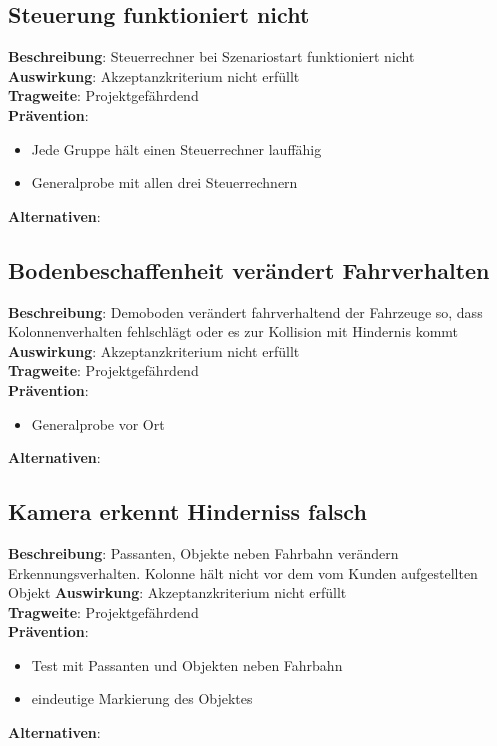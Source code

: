 \documentclass[a4paper, 12pt, titlepage]{scrartcl}
\begin{document}
	\subsection{Steuerung funktioniert nicht}
		\textbf{Beschreibung}: Steuerrechner bei Szenariostart funktioniert nicht\\
		\textbf{Auswirkung}: Akzeptanzkriterium nicht erfüllt\\
		\textbf{Tragweite}: Projektgefährdend\\
		\textbf{Prävention}:		
		\begin{itemize}
			\item Jede Gruppe hält einen Steuerrechner lauffähig
			\item Generalprobe mit allen drei Steuerrechnern
		\end{itemize}
		\textbf{Alternativen}: 

	\subsection{Bodenbeschaffenheit verändert Fahrverhalten}
		\textbf{Beschreibung}: Demoboden verändert fahrverhaltend der Fahrzeuge so, dass Kolonnenverhalten fehlschlägt oder es zur Kollision mit Hindernis kommt\\
		\textbf{Auswirkung}: Akzeptanzkriterium nicht erfüllt\\
		\textbf{Tragweite}: Projektgefährdend\\
		\textbf{Prävention}:
		\begin{itemize}
			\item Generalprobe vor Ort
		\end{itemize}
		\textbf{Alternativen}: 

	\subsection{Kamera erkennt Hinderniss falsch}
		\textbf{Beschreibung}: Passanten, Objekte neben Fahrbahn verändern Erkennungsverhalten. Kolonne hält nicht vor dem vom Kunden aufgestellten Objekt
		\textbf{Auswirkung}: Akzeptanzkriterium nicht erfüllt\\
		\textbf{Tragweite}: Projektgefährdend\\
		\textbf{Prävention}: \\
		\begin{itemize}
			\item Test mit Passanten und Objekten neben Fahrbahn
			\item eindeutige Markierung des Objektes
		\end{itemize}
		\textbf{Alternativen}: 
\end{document}
